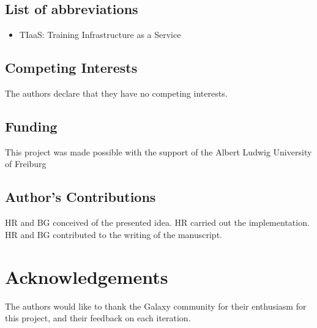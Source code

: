 \documentclass[a4paper,num-refs]{oup-contemporary}
\begin{document}
\subsection{List of abbreviations}
\begin{itemize}
\item TIaaS: Training Infrastructure as a Service
\end{itemize}


\subsection{Competing Interests}
The authors declare that they have no competing interests.

\subsection{Funding}
This project was made possible with the support of the Albert Ludwig University of Freiburg

\subsection{Author's Contributions}
HR and BG conceived of the presented idea. HR carried out the implementation. HR and BG contributed to the writing of the manuscript.

\section{Acknowledgements}
The authors would like to thank the Galaxy community for their enthusiasm for this project, and their feedback on each iteration.


\end{document}
